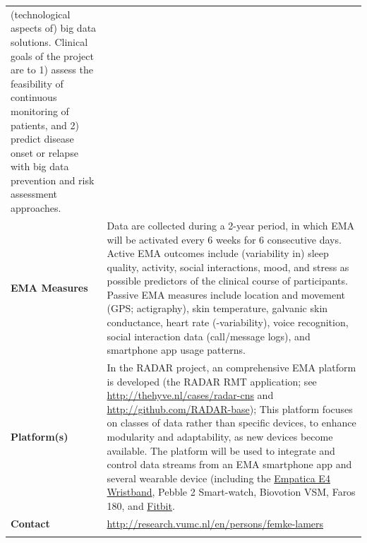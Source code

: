 \documentclass[]{book}
\begin{document}
\begin{longtable}[]{@{}ll@{}}
\begin{minipage}[t]{0.69\columnwidth}
(technological aspects of) big data solutions. Clinical goals of the
project are to 1) assess the feasibility of continuous monitoring of
patients, and 2) predict disease onset or relapse with big data
prevention and risk assessment approaches.\strut
\end{minipage}\tabularnewline
\begin{minipage}[t]{0.25\columnwidth}\raggedright\strut
\textbf{EMA Measures}\strut
\end{minipage} & \begin{minipage}[t]{0.69\columnwidth}\raggedright\strut
Data are collected during a 2-year period, in which EMA will be
activated every 6 weeks for 6 consecutive days. Active EMA outcomes
include (variability in) sleep quality, activity, social interactions,
mood, and stress as possible predictors of the clinical course of
participants. Passive EMA measures include location and movement (GPS;
actigraphy), skin temperature, galvanic skin conductance, heart rate
(-variability), voice recognition, social interaction data (call/message
logs), and smartphone app usage patterns.\strut
\end{minipage}\tabularnewline
\begin{minipage}[t]{0.25\columnwidth}\raggedright\strut
\textbf{Platform(s)}\strut
\end{minipage} & \begin{minipage}[t]{0.69\columnwidth}\raggedright\strut
In the RADAR project, an comprehensive EMA platform is developed (the
RADAR RMT application; see \url{http://thehyve.nl/cases/radar-cns} and
\url{http://github.com/RADAR-base}); This platform focuses on classes of
data rather than specific devices, to enhance modularity and
adaptability, as new devices become available. The platform will be used
to integrate and control data streams from an EMA smartphone app and
several wearable device (including the
\href{http://www.empatica.com/research/e4/}{Empatica E4 Wristband},
Pebble 2 Smart-watch, Biovotion VSM, Faros 180, and
\href{http://www.fitbit.com/home}{Fitbit}.\strut
\end{minipage}\tabularnewline
\begin{minipage}[t]{0.25\columnwidth}\raggedright\strut
\textbf{Contact}\strut
\end{minipage} & \begin{minipage}[t]{0.69\columnwidth}\raggedright\strut
\url{http://research.vumc.nl/en/persons/femke-lamers}\strut
\end{minipage}\tabularnewline
\begin{minipage}[t]{0.25\columnwidth}\raggedright\strut

\end{minipage}
\end{longtable}
\end{document}
